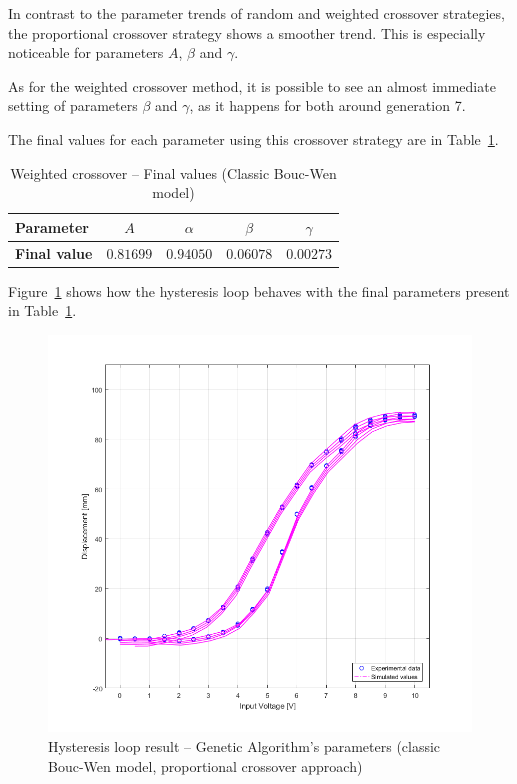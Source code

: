 In contrast to the parameter trends of random and weighted crossover strategies,
the proportional crossover strategy shows a smoother trend. 
This is especially noticeable for parameters $A$, $\beta$ and $\gamma$.

As for the weighted crossover method, it is possible to see an almost
immediate setting of parameters $\beta$ and $\gamma$, as it happens
for both around generation 7.

The final values for each parameter using this crossover strategy
are in Table~\ref{tab:ga_classic_prop_final}.

\begin{table}[H]
	\centering
	\begin{tabular}{l c c c c}
		\toprule
		\textbf{Parameter}		& $A$	& $\alpha$	& $\beta$	& $\gamma$ 	\\ \midrule
		\textbf{Final value}	& $0.81699$	& $0.94050$	& $0.06078$ & $0.00273$	\\ \bottomrule
	\end{tabular}
	\caption{Weighted crossover -- Final values (Classic Bouc-Wen model)}
	\label{tab:ga_classic_prop_final}
\end{table}

Figure~\ref{fig:ga_classic_res} shows how the hysteresis loop behaves
with the final parameters present in Table~\ref{tab:ga_classic_prop_final}.

\begin{figure}[H]
	\centering
	\includegraphics[width=\linewidth]{Images/ga_prop_final}
	\caption{Hysteresis loop result -- Genetic Algorithm's parameters (classic Bouc-Wen model, proportional crossover approach)}
	\label{fig:ga_classic_res}
\end{figure}

